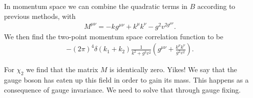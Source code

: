 In momentum space we can combine the quadratic terms in $B$ according to previous methods, with
\begin{align*}
M^{\mu\nu} = -k^{}g^{\mu\nu} + k^{\mu}k^{\nu} - g^{2}v^{2g^{\mu\nu}}.
\end{align*}
We then find the two-point momentum space correlation function to be
\begin{align*}
-(2\pi)^{4}\delta(k_{1} + k_{2})\frac{1}{k^{2} + g^{2}v^{2}}\left(g^{\mu\nu} + \frac{k^{\mu}k^{\nu}}{g^{2}v^{2}}\right).
\end{align*}

For $\chi_{2}$ we find that the matrix $M$ is identically zero. Yikes! We say that the gauge boson has eaten up this field in order to gain its mass. This happens as a consequence of gauge invariance. We need to solve that through gauge fixing.